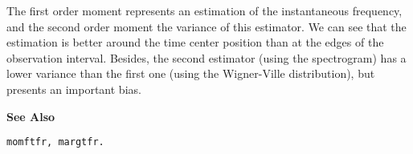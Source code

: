 
\hspace*{1.5cm}
\begin{minipage}[t]{13.5cm}
The first order moment represents an estimation of the instantaneous
frequency, and the second order moment the variance of this estimator. We
can see that the estimation is better around the time center position than
at the edges of the observation interval. Besides, the second estimator
(using the spectrogram) has a lower variance than the first one (using the
Wigner-Ville distribution), but presents an important bias.
\end{minipage}
\vspace*{1cm}


{\bf \large \sf See Also}\\
\hspace*{1.5cm}
\begin{minipage}[t]{13.5cm}
\begin{verbatim}
momftfr, margtfr.
\end{verbatim}
\end{minipage}

